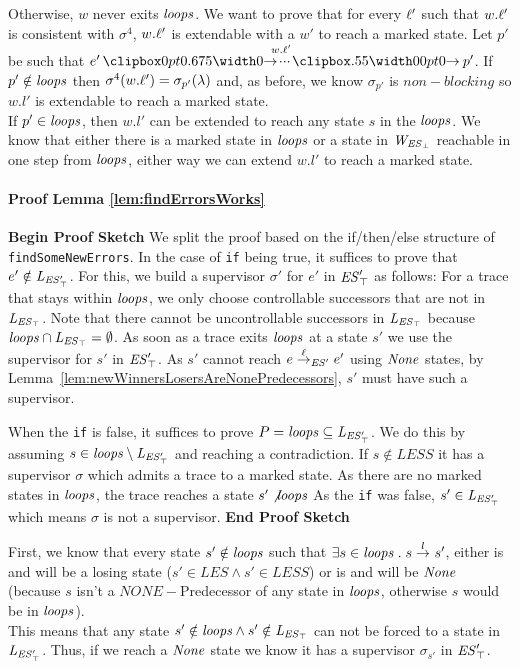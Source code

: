 Otherwise, $w$ never exits $\mathit{loops}$. We want to prove that for every $\ell'$ such that $w.\ell'$ is consistent with $\sigma^4$, $w.\ell'$ is extendable with a $w'$ to reach a marked state. Let $p'$ be such that $e' \runw{w.\l'}{} p'$. If $p' \notin \mathit{loops}$ then $\sigma^4(w.\ell') = \sigma_{p'}(\lambda)$ and, as before, we know $\sigma_{p'}$ is $non-blocking$ so $w.l'$ is extendable to reach a marked state.\\
If $p' \in \mathit{loops}$, then  $w.l'$ can be extended to reach any state $s$ in the $\mathit{loops}$. We know that either there is a marked state in $\mathit{loops}$ or a state in $\mathit{W_{\mathit{\mathit{ES}_{\bot}}}}$ reachable in one step from $\mathit{loops}$, either way we can extend $w.l'$ to reach a marked state.\\



\paragraph*{Proof Lemma \ref{lem:findErrorsWorks}}
\textbf{{Begin Proof Sketch}}
We split the proof based on the if/then/else structure of \texttt{findSomeNewErrors}. 
In the case of \texttt{if} being true, it suffices to prove that $e' \notin \mathit{L_{\mathit{\mathit{ES}'_{\top}}}}$. For this, 
we build a supervisor $\sigma'$ for $e'$ in $\mathit{\mathit{ES}'_{\top}}$ as 
follows: For a trace that stays within $\mathit{loops}$, we only choose controllable successors 
that are not 
in $\mathit{L_{\mathit{\mathit{ES}_{\top}}}}$. Note that there cannot be uncontrollable successors in $\mathit{L_{\mathit{\mathit{ES}_{\top}}}}$ because 
$\mathit{loops} \cap \mathit{L_{\mathit{\mathit{ES}_{\top}}}}= \emptyset$.   As soon as a trace exits $\mathit{loops}$ at a state $s'$ we 
use the supervisor for $s'$ in $\mathit{\mathit{ES}'_{\top}}$. 
As $s'$ cannot reach $e \overset{\ell}{\rightarrow}_{\mathit{ES}'} 
e'$ using $\mathit{None}$ states, by 
Lemma~\ref{lem:newWinnersLosersAreNonePredecessors}, $s'$ must have such a 
supervisor. 
 
When the \texttt{if} is false, it suffices to prove $P = \mathit{loops} \subseteq \mathit{L_{\mathit{\mathit{ES}'_{\top}}}}$. We do 
this by assuming $s \in \mathit{loops} \setminus \mathit{L_{\mathit{\mathit{ES}'_{\top}}}}$ and reaching a contradiction. If $s 
\notin LESS$ it has a supervisor $\sigma$ which admits a trace to a marked state. As 
there are no marked states in $\mathit{loops}$, the trace reaches a state $s' \not \mathit{loops}$ As the 
\texttt{if} was false, $s' \in \mathit{L_{\mathit{\mathit{ES}'_{\top}}}}$ which means $\sigma$ is not a supervisor.
\textbf{{End Proof Sketch}}


First, we know that every state $s' \notin \mathit{loops}$ such that $\exists s \in \mathit{loops} \;.\; s 
\overset{l}{\rightarrow}_{} s'$, either is and will be a losing state ($s' \in LES \wedge s' \in LESS$) or is 
and will be $\mathit{None}$ (because $s$ isn't a $NONE-$Predecessor of any state in 
$\mathit{loops}$, otherwise $s$ would be in $\mathit{loops}$). \\
This means that any state $s' \notin \mathit{loops} \wedge s' \notin \mathit{L_{\mathit{\mathit{ES}_{\top}}}}$ can not be forced to a state in $\mathit{L_{\mathit{\mathit{ES}'_{\top}}}}$. Thus, if we reach a $\mathit{None}$ state we know it has a supervisor $\sigma_{s'}$ in $\mathit{\mathit{ES}'_{\top}}$.

